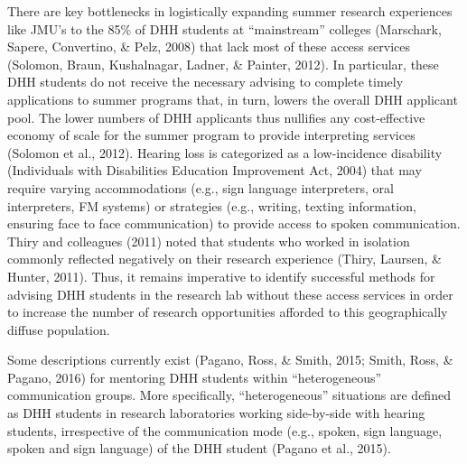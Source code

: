\documentclass[11.5pt]{sig-alternate} %
\begin{document}
\begin{large}
There are key bottlenecks in logistically expanding summer research experiences like JMU’s to the 85\% of DHH students at “mainstream” colleges (Marschark, Sapere, Convertino, \& Pelz, 2008) that lack most of these access services (Solomon, Braun, Kushalnagar, Ladner, \& Painter, 2012). In particular, these DHH students do not receive the necessary advising to complete timely applications to summer programs that, in turn, lowers the overall DHH applicant pool. The lower numbers of DHH applicants thus nullifies any cost-effective economy of scale for the summer program to provide interpreting services (Solomon et al., 2012). Hearing loss is categorized as a low-incidence disability (Individuals with Disabilities Education Improvement Act, 2004) that may require varying accommodations (e.g., sign language interpreters, oral interpreters, FM systems) or strategies (e.g., writing, texting information, ensuring face to face communication) to provide access to spoken communication. Thiry and colleagues (2011) noted that students who worked in isolation commonly reflected negatively on their research experience (Thiry, Laursen, \& Hunter, 2011). Thus, it remains imperative to identify successful methods for advising DHH students in the research lab without these access services in order to increase the number of research opportunities afforded to this geographically diffuse population. 

Some descriptions currently exist (Pagano, Ross, \& Smith, 2015; Smith, Ross, \& Pagano, 2016) for mentoring DHH students within “heterogeneous” communication groups. More specifically, “heterogeneous” situations are defined as DHH students in research laboratories working side-by-side with hearing students, irrespective of the communication mode (e.g., spoken, sign language, spoken and sign language) of the DHH student (Pagano et al., 2015). 


\end{large}
\end{document}
